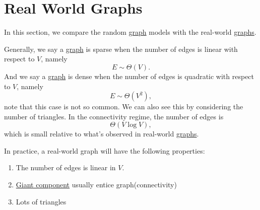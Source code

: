 \section{Real World Graphs}\label{sec:real-world-graphs}
In this section, we compare the random \hyperref[def:graph]{graph} models with the real-world \hyperref[def:graph]{graphs}.
\begin{remark}
	Generally, we say a \hyperref[def:graph]{graph} is sparse when the number of edges is linear with respect to \(V\), namely
	\[
		E\sim \Theta(V).
	\]
	And we say a \hyperref[def:graph]{graph} is dense when the number of edges is quadratic with respect to \(V\), namely
	\[
		E\sim \Theta(V^2),
	\]
	note that this case is not so common. We can also see this by considering the number of triangles. In the connectivity regime, the number of edges is
	\[
		\Theta(V\log V),
	\]
	which is small relative to what's observed in real-world \hyperref[def:graph]{graphs}.
\end{remark}

In practice, a real-world graph will have the following properties:
\begin{enumerate}
	\item The number of edges is linear in \(V\).
	\item \hyperref[def:giant-component]{Giant component} usually entice graph(connectivity)
	\item Lots of triangles
\end{enumerate}

